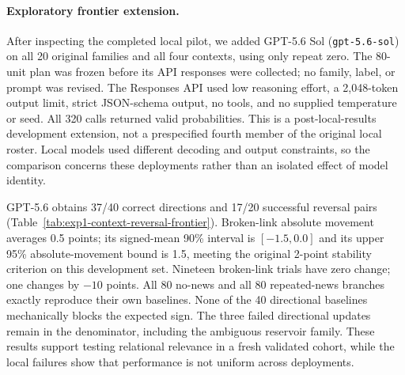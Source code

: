 \paragraph{Exploratory frontier extension.}
After inspecting the completed local pilot, we added GPT-5.6 Sol
(\texttt{gpt-5.6-sol}) on all 20 original families and all four contexts, using
only repeat zero. The 80-unit plan was frozen before its API responses were
collected; no family, label, or prompt was revised. The Responses API used low
reasoning effort, a 2,048-token output limit, strict JSON-schema output, no tools,
and no supplied temperature or seed. All 320 calls returned valid probabilities.
This is a post-local-results development extension, not a prespecified fourth
member of the original local roster. Local models used different decoding and
output constraints, so the comparison concerns these deployments rather than an
isolated effect of model identity.

\begin{center}
\begin{minipage}{\linewidth}
\centering
{}
\label{tab:exp1-context-reversal-frontier}
\small

\end{minipage}
\end{center}

GPT-5.6 obtains 37/40 correct directions and 17/20 successful reversal pairs
(Table~\ref{tab:exp1-context-reversal-frontier}). Broken-link absolute movement
averages 0.5 points; its signed-mean 90\% interval is $[-1.5,0.0]$ and its upper
95\% absolute-movement bound is 1.5, meeting the original 2-point stability
criterion on this development set. Nineteen broken-link trials have zero change;
one changes by $-10$ points. All 80 no-news and all 80 repeated-news branches
exactly reproduce their own baselines. None of the 40 directional baselines
mechanically blocks the expected sign. The three failed directional updates
remain in the denominator, including the ambiguous reservoir family. These
results support testing relational relevance in a fresh validated cohort, while
the local failures show that performance is not uniform across deployments.

